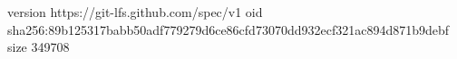 version https://git-lfs.github.com/spec/v1
oid sha256:89b125317babb50adf779279d6ce86cfd73070dd932ecf321ac894d871b9debf
size 349708
